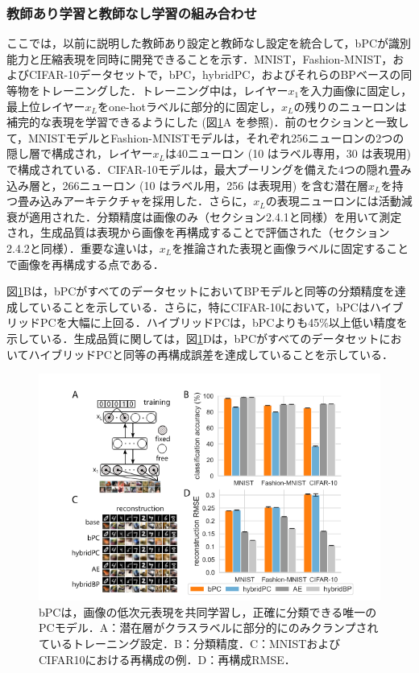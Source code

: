 \documentclass[a4paper, titlepage]{jsarticle}
\begin{document}
\subsubsection{教師あり学習と教師なし学習の組み合わせ}
ここでは，以前に説明した教師あり設定と教師なし設定を統合して，bPCが識別能力と圧縮表現を同時に開発できることを示す．MNIST，Fashion-MNIST，およびCIFAR-10データセットで，bPC，hybridPC，およびそれらのBPベースの同等物をトレーニングした．トレーニング中は，レイヤー$x_1$を入力画像に固定し，最上位レイヤー$x_L$をone-hotラベルに部分的に固定し，$x_L$の残りのニューロンは補完的な表現を学習できるようにした (図\ref{ex_result3}A を参照)．前のセクションと一致して，MNISTモデルとFashion-MNISTモデルは，それぞれ256ニューロンの2つの隠し層で構成され，レイヤー$x_L$は40ニューロン (10 はラベル専用，30 は表現用) で構成されている．CIFAR-10モデルは，最大プーリングを備えた4つの隠れ畳み込み層と，266ニューロン (10 はラベル用，256 は表現用) を含む潜在層$x_L$を持つ畳み込みアーキテクチャを採用した．さらに，$x_L$の表現ニューロンには活動減衰が適用された．分類精度は画像のみ（セクション2.4.1と同様）を用いて測定され，生成品質は表現から画像を再構成することで評価された（セクション2.4.2と同様）．重要な違いは，$x_L$を推論された表現と画像ラベルに固定することで画像を再構成する点である．
\par
図\ref{ex_result3}Bは，bPCがすべてのデータセットにおいてBPモデルと同等の分類精度を達成していることを示している．さらに，特にCIFAR-10において，bPCはハイブリッドPCを大幅に上回る．ハイブリッドPCは，bPCよりも45\%以上低い精度を示している．生成品質に関しては，図\ref{ex_result3}Dは，bPCがすべてのデータセットにおいてハイブリッドPCと同等の再構成誤差を達成していることを示している．
\begin{figure}[htbp]
   \centering
   \includegraphics[scale=0.8]{x5.png}
   \caption{bPCは，画像の低次元表現を共同学習し，正確に分類できる唯一のPCモデル．A：潜在層がクラスラベルに部分的にのみクランプされているトレーニング設定．B：分類精度．C：MNISTおよびCIFAR10における再構成の例．D：再構成RMSE．}
   \label{ex_result3}
\end{figure} \\
\end{document}
